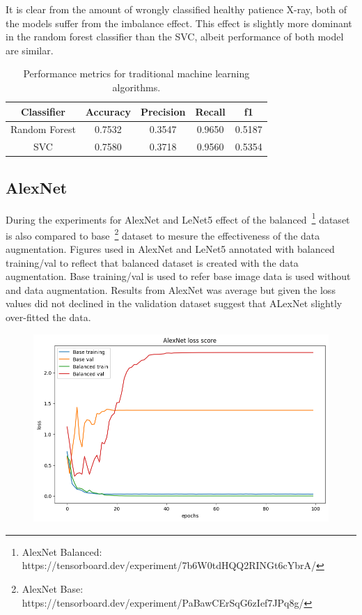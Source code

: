 It is clear from the amount of wrongly classified healthy patience X-ray, both of the models suffer from the imbalance effect.
This effect is slightly more dominant in the random forest classifier than the SVC, albeit performance of both model are similar.

\begin{table}[H]
    \centering
    \begin{tabular}{||c c c c c||} 
    \hline
    Classifier & Accuracy & Precision & Recall & f1\\ [0.5ex] 
    \hline\hline
    Random Forest & 0.7532 & 0.3547 & 0.9650 & 0.5187\\ 
    \hline
    SVC & 0.7580 & 0.3718 & 0.9560 & 0.5354\\
    \hline
    \end{tabular}
    \caption{Performance metrics for traditional machine learning algorithms.}
    \label{table:mlmetrics}
\end{table}



\subsection{AlexNet}
During the experiments for AlexNet and LeNet5 effect of the balanced~\footnote{AlexNet Balanced: https://tensorboard.dev/experiment/7b6W0tdHQQ2RINGt6cYbrA/} dataset is also compared to base~\footnote{AlexNet Base: https://tensorboard.dev/experiment/PaBawCErSqG6zIef7JPq8g/} dataset to mesure the effectiveness of the data augmentation.
Figures used in AlexNet and LeNet5 annotated with balanced training/val to reflect that balanced dataset is created with the data augmentation.
Base training/val is used to refer base image data is used without and data augmentation.
Results from AlexNet was average but given the loss values did not declined in the validation dataset suggest that ALexNet slightly over-fitted the data.

\begin{figure}[H]
    \centering
    \includegraphics[width=.9\textwidth]{img/alexnetloss.png}
    \caption{}
    \label{fig:alexloss}
\end{figure}


